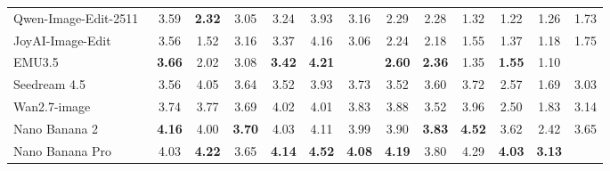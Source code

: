 \begin{table}[t]
{\begin{tabular}{l|cccccc|cccccc}
            Qwen-Image-Edit-2511~\cite{wu2025qwen}
            & 3.59  & \color[HTML]{F88825}\textbf{2.32} & 3.05 & 3.24 & 3.93 & \cellcolor[HTML]{C8C8C8}3.16 & 2.29 & 2.28 & 1.32 & 1.22 & 1.26
            & \cellcolor[HTML]{C8C8C8}1.73 \\


            JoyAI-Image-Edit~\cite{joyaiimage2026}
            & 3.56& 1.52 & 3.16 & 3.37 & 4.16 & \cellcolor[HTML]{C8C8C8}3.06 & 2.24 & 2.18 & 1.55 & 1.37 & 1.18
            & \cellcolor[HTML]{C8C8C8}1.75 \\

            EMU3.5~\cite{cui2025emu3}
            & \color[HTML]{F88825}\textbf{3.66}  & 2.02 & 3.08 & \color[HTML]{F88825}\textbf{3.42} & \color[HTML]{F88825}\textbf{4.21} & \cellcolor[HTML]{C8C8C8}{\color[HTML]{F88825}\textbf{3.20}} & \color[HTML]{F88825}\textbf{2.60} & \color[HTML]{F88825}\textbf{2.36} & 1.35 & \color[HTML]{F88825}\textbf{1.55} & 1.10
            & \cellcolor[HTML]{C8C8C8}{\color[HTML]{F88825}\textbf{1.86}} \\


            

            \midrule

            Seedream 4.5~\cite{seedream2025seedream}
            & 3.56 & 4.05 & 3.64 & 3.52 & 3.93 & \cellcolor[HTML]{C8C8C8}3.73 & 3.52 & 3.60 & 3.72 & 2.57 & 1.69
            & \cellcolor[HTML]{C8C8C8}3.03 \\

            Wan2.7-image~\cite{nanobananapro}
            & 3.74 & 3.77 & 3.69 & 4.02 & 4.01 & \cellcolor[HTML]{C8C8C8}3.83 & 3.88 & 3.52 & 3.96 & 2.50 & 1.83
            & \cellcolor[HTML]{C8C8C8} 3.14  \\

            Nano Banana 2~\cite{gemini3pro}
            & \color[HTML]{319B62}\textbf{4.16} & 4.00 & \color[HTML]{319B62}\textbf{3.70} & 4.03 & 4.11 & \cellcolor[HTML]{C8C8C8}3.99 & 3.90 & \color[HTML]{319B62}\textbf{3.83} & \color[HTML]{319B62}\textbf{4.52} & 3.62 & 2.42
            & \cellcolor[HTML]{C8C8C8} 3.65  \\

            Nano Banana Pro~\cite{nanobananapro}
            & 4.03 & \color[HTML]{319B62}\textbf{4.22} & 3.65 & \color[HTML]{319B62}\textbf{4.14} & \color[HTML]{319B62}\textbf{4.52} &  \cellcolor[HTML]{C8C8C8}\color[HTML]{319B62}\textbf{4.08} & \color[HTML]{319B62}\textbf{4.19} & 3.80 & 4.29 & \color[HTML]{319B62}\textbf{4.03} & \color[HTML]{319B62}\textbf{3.13}
            & \cellcolor[HTML]{C8C8C8}{\color[HTML]{319B62}\textbf{3.89}} \\


\end{tabular}}
\end{table}
